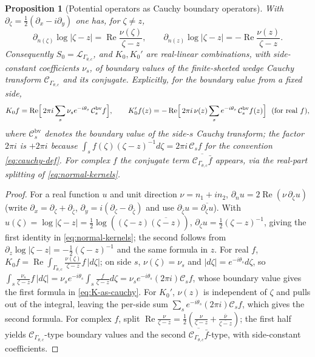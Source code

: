 \documentclass[pdflatex,sn-mathphys-num]{sn-jnl}%
\newcommand{\Cau}{\mathcal{C}}
\newcommand{\Lop}{\mathcal{L}}
\newcommand{\Gw}{\Gamma_{\theta,c}}
\newcommand{\Real}{\operatorname{Re}}
\theoremstyle{thmstyleone}
\newtheorem{proposition}[theorem]{Proposition}%
\theoremstyle{thmstyletwo}
\theoremstyle{thmstylethree}
\begin{document}
\begin{proposition}[Potential operators as Cauchy boundary operators]
\label{prop:potential-algebra}
With $\partial_\zeta=\tfrac12(\partial_{x}-i\partial_{y})$ one has, for
$\zeta\neq z$,
\begin{equation}\label{eq:normal-kernels}
  \partial_{n(\zeta)}\log|\zeta-z|=\Real\frac{\nu(\zeta)}{\zeta-z},
  \qquad
  \partial_{n(z)}\log|\zeta-z|=-\Real\frac{\nu(z)}{\zeta-z}.
\end{equation}
Consequently $S_0=\Lop_{\Gw}$, and $K_0,K_0'$ are real-linear combinations, with
side-constant coefficients $\nu_s$, of boundary values of the finite-sheeted
wedge Cauchy transform $\Cau_{\Gw}$ and its conjugate. Explicitly, for the
boundary value from a fixed side,
\begin{equation}\label{eq:K-as-cauchy}
  K_0 f=\Real\Bigl[\,2\pi i\sum_{s}\nu_s e^{-i\theta_s}\,\Cau^{\mathrm{bv}}_{s}f\Bigr],
  \qquad
  K_0' f(z)=-\Real\Bigl[\,2\pi i\,\nu(z)\sum_{s} e^{-i\theta_s}\,\Cau^{\mathrm{bv}}_{s}f(z)\Bigr]
  \ \ (\text{for real }f),
\end{equation}
where $\Cau^{\mathrm{bv}}_{s}$ denotes the boundary value of the side-$s$ Cauchy
transform; the factor $2\pi i$ is $+2\pi i$ because $\int_s f(\zeta)(\zeta-z)^{-1}
d\zeta=2\pi i\,\Cau_s f$ for the convention \eqref{eq:cauchy-def}. For complex
$f$ the conjugate term $\overline{\Cau_{\Gw}\bar f}$ appears, via the real-part
splitting of \eqref{eq:normal-kernels}.
\end{proposition}

\begin{proof}
For a real function $u$ and unit direction $\nu=n_1+in_2$,
$\partial_n u=2\Real(\nu\,\partial_\zeta u)$ (write
$\partial_x=\partial_\zeta+\partial_{\bar\zeta}$,
$\partial_y=i(\partial_\zeta-\partial_{\bar\zeta})$ and use
$\partial_{\bar\zeta}u=\overline{\partial_\zeta u}$). With
$u(\zeta)=\log|\zeta-z|=\tfrac12\log((\zeta-z)\overline{(\zeta-z)})$,
$\partial_\zeta u=\tfrac12(\zeta-z)^{-1}$, giving the first identity in
\eqref{eq:normal-kernels}; the second follows from
$\partial_z\log|\zeta-z|=-\tfrac12(\zeta-z)^{-1}$ and the same formula in $z$.
For real $f$, $K_0 f=\Real\int_{\Gw}\frac{\nu(\zeta)}{\zeta-z}f\,|d\zeta|$;
on side $s$, $\nu(\zeta)=\nu_s$ and $|d\zeta|=e^{-i\theta_s}d\zeta$, so
$\int_s\frac{\nu_s}{\zeta-z}f\,|d\zeta|
=\nu_s e^{-i\theta_s}\int_s\frac{f}{\zeta-z}d\zeta
=\nu_s e^{-i\theta_s}(2\pi i)\Cau_s f$, whose boundary value gives the first
formula in \eqref{eq:K-as-cauchy}. For $K_0'$, $\nu(z)$ is independent of
$\zeta$ and pulls out of the integral, leaving the per-side sum
$\sum_s e^{-i\theta_s}(2\pi i)\Cau_s f$, which gives the second formula. For
complex $f$, split
$\Real\frac{\nu}{\zeta-z}=\tfrac12(\frac{\nu}{\zeta-z}
+\frac{\bar\nu}{\overline{\zeta-z}})$; the first half yields $\Cau_{\Gw}$-type
boundary values and the second
$\overline{\Cau_{\Gw}\bar f}$-type, with side-constant coefficients.
\end{proof}
\end{document}

